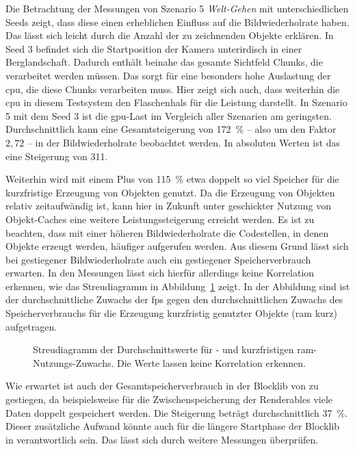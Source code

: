Die Betrachtung der Messungen von Szenario 5 \emph{Welt-Gehen} mit unterschiedlichen Seeds zeigt, dass diese einen erheblichen Einfluss auf die Bildwiederholrate haben. Das lässt sich leicht durch die Anzahl der zu zeichnenden Objekte erklären. In Seed 3 befindet sich die Startposition der Kamera unterirdisch in einer Berglandschaft. Dadurch enthält beinahe das gesamte Sichtfeld Chunks, die verarbeitet werden müssen. Das sorgt für eine besonders hohe Auslastung der \ac{cpu}, die diese Chunks verarbeiten muss. Hier zeigt sich auch, dass weiterhin die \ac{cpu} in diesem Testsystem den Flaschenhals für die Leistung darstellt.
In Szenario 5 mit dem Seed 3 ist die \ac{gpu}-Last im Vergleich aller Szenarien am geringsten. Durchschnittlich kann eine Gesamtsteigerung von \SI{172}{\percent} -- also um den Faktor $2,72$ -- in der Bildwiederholrate beobachtet werden. In absoluten Werten ist das eine Steigerung von \SI{311}{\fps}.

Weiterhin wird mit einem Plus von \SI{115}{\percent} etwa doppelt so viel Speicher für die kurzfristige Erzeugung von Objekten genutzt. Da die Erzeugung von Objekten relativ zeitaufwändig ist, kann hier in Zukunft unter geschickter Nutzung von Objekt-Caches eine weitere Leistungssteigerung erreicht werden. Es ist zu beachten, dass mit einer höheren Bildwiederholrate die Codestellen, in denen Objekte erzeugt werden, häufiger aufgerufen werden. Aus diesem Grund lässt sich bei gestiegener Bildwiederholrate auch ein gestiegener Speicherverbrauch erwarten. In den Messungen lässt sich hierfür allerdings keine Korrelation erkennen, wie das Streudiagramm in Abbildung~\ref{fig:Streudiagramm} zeigt. In der Abbildung sind ist der durchschnittliche Zuwachs der \ac{fps} gegen den durchschnittlichen Zuwachs des Speicherverbrauchs für die Erzeugung kurzfristig genutzter Objekte (\ac{ram} kurz) aufgetragen. 
\begin{figure}
	\centering
		\caption[Streudiagramm der Durchschnittswerte für - und kurzfristigen -Nutzungs-Zuwachs.]{Streudiagramm der Durchschnittswerte für \si{\fps}- und kurzfristigen \ac{ram}-Nutzungs-Zuwachs. Die Werte lassen keine Korrelation erkennen.}\label{fig:Streudiagramm}
\end{figure}

Wie erwartet ist auch der Gesamtspeicherverbrauch in der Blocklib von \sysA{} zu \sysB{} gestiegen, da beispielsweise für die Zwischenspeicherung der Renderables viele Daten doppelt gespeichert werden. Die Steigerung beträgt durchschnittlich \SI{37}{\percent}.
Dieser zusätzliche Aufwand könnte auch für die längere Startphase der Blocklib in \sysB{} verantwortlich sein. Das lässt sich durch weitere Messungen überprüfen.